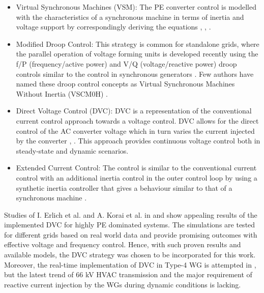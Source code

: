 \begin{itemize}
    \item Virtual Synchronous Machines (VSM): The \gls{PE} converter control is modelled with the characteristics of a synchronous machine in terms of inertia and voltage support by correspondingly deriving the equations \cite{markovic2018lqr}, \cite{duckwitz_operating_behavior}, \cite{lu_virtual_2019}.
    
    \item Modified Droop Control:
    This strategy is common for standalone grids, where the parallel operation of voltage forming units is developed recently using the f/P (frequency/active power) and V/Q (voltage/reactive power) droop controls similar to the control in synchronous generators \cite{bouzid2016simulation}. Few authors have named these droop control concepts as Virtual Synchronous Machines Without Inertia (VSCM0H) \cite{yu2016use}.
    
    \item Direct Voltage Control (\gls{DVC}):
    \gls{DVC} is a representation of the conventional current control approach towards a voltage control. \gls{DVC} allows for the direct control of the \gls{AC} converter voltage which in turn varies the current injected by the converter  \cite{korai_dynamic_2019}, \cite{erlich_new_2017}. This approach provides continuous voltage control both in steady-state and dynamic scenarios. %
    
    \item Extended Current Control:
    The control is similar to the conventional current control with an additional inertia control in the outer control loop by using a synthetic inertia controller that gives a behaviour similar to that of a synchronous machine \cite{duckwitz_derivation_2019} \cite{liu2017control}. 
\end{itemize}

Studies of I. Erlich et al. and A. Korai et al. in \cite{erlich_new_2017} and \cite{korai_dynamic_2019} show appealing results of the implemented \gls{DVC} for highly \gls{PE} dominated systems. The simulations are tested for different grids based on real world data and provide promising outcomes with effective voltage and frequency control. Hence, with such proven results and available models, the \gls{DVC} strategy was chosen to be incorporated for this work. Moreover, the real-time implementation of \gls{DVC} in Type-4 \gls{WG} is attempted in \cite{sethi_real-time_nodate-new}, but the latest trend of 66 kV \gls{HVAC} transmission and the major requirement of reactive current injection by the \gls{WG}s during dynamic conditions is lacking.

